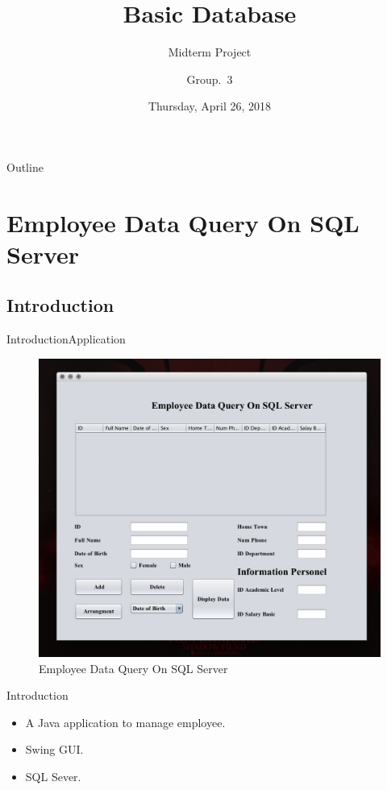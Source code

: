 \documentclass{beamer}
\title{Basic Database}
\subtitle{Midterm Project}
\author{Group.~3}
\institute[University of Science And Technology of Hanoi] %
{

  \inst{}%
  University of Science And Technology of Hanoi
  \and
  \inst{}%
  ICT Department
}
\date{Thursday, April 26, 2018}
\begin{document}
\begin{frame}
  \titlepage
\end{frame}

\begin{frame}{Outline}
  \tableofcontents
\end{frame}

\section{Employee Data Query On SQL Server}

\subsection{Introduction}
\begin{frame}{Introduction}{Application}
\begin{figure}
  \includegraphics[scale=0.24]{1}
  \caption{Employee Data Query On SQL Server}

\end{figure}
\end{frame}

\begin{frame}{Introduction}
  \begin{itemize}
  \item {
   A Java application to manage employee.
  }
  \item {
    Swing GUI.
  }
  \item{
   SQL Sever.

  }
  \end{itemize}
\end{frame}
\end{document}
